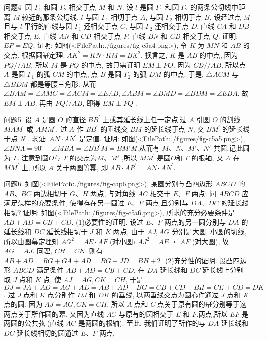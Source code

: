 问题4. 圆 $\Gamma_1$ 和圆 $\Gamma_2$ 相交于点 $M$ 和 $N$. 设 $l$ 是圆 $\Gamma_1$ 和圆 $\Gamma_2$ 的两条公切线中距离 $M$ 较近的那条公切线.
$l$ 与圆 $\Gamma_1$ 相切于点 $A$, 与圆 $\Gamma_2$ 相切于点 $B$. 设经过点 $M$ 且与 $l$ 平行的直线与圆 $\Gamma_1$ 还相交于点 $C$, 与圆 $\Gamma_2$ 还相交于点 $D$. 直线 $C A$ 和 $D B$ 相交于点 $E$, 直线 $A N$ 和 $C D$ 相交于点 $P$, 直线 $B N$ 和 $C D$ 相交于点 $Q$. 证明: $E P=E Q$.
证明: 如图(<FilePath:./figures/fig-c5a4.png>), 令 $K$ 为 $M N$ 和 $A B$ 的交点.
根据圆幂定理: $A K^2=K N \cdot K M=B K^2$. 换言之, $K$ 是 $A B$ 的中点, 因为 $P Q / / A B$, 所以 $M$ 是 $P Q$ 的中点, 故只需证明 $E M \perp P Q$.
因为 $C D // A B$, 所以点 $A$ 是圆 $\Gamma_1$ 的弧 $C M$ 的中点, 点 $B$ 是圆 $\Gamma_2$ 的弧 $D M$ 的中点.
于是, $\triangle A C M$ 与 $\triangle B D M$ 都是等腰三角形.
从而 $\angle B A M= \angle A M C=\angle A C M=\angle E A B, \angle A B M= \angle B M D=\angle B D M=\angle E B A$. 故 $E M \perp A B$. 再由 $PQ // AB$, 即得 $E M\perp P Q$ .



问题5. 设 $A$ 是圆 $O$ 的直径 $B B^{\prime}$ 上或其延长线上任一定点,过 $A$ 引圆 $O$ 的割线 $M A M^{\prime}$ 或 $A M M^{\prime}$, 过 $A$ 作 $B B^{\prime}$ 的垂线交 $B M$ 的延长线于点 $N$, 交 $B M^{\prime}$ 的延长线于点 $N^{\prime}$. 求证: $A N \cdot A N^{\prime}$ 是定值.
证明: 如图(<FilePath:./figures/fig-c5a5.png>), $\angle B N A=90^{\circ}-\angle M B A=\angle B B^{\prime}M= BM'M$.从而有 $M、N、M'、N'$ 共圆,记此圆为 $\Gamma$. 注意到圆$O$与 $\Gamma$ 的交点为$M、M'$ ,所以 $M M^{\prime}$ 是圆$O$和 $\Gamma$ 的根轴, 又 $A$ 在 $M M^{\prime}$ 上, 所以 $A$ 关于两圆等幂, 即 $A B \cdot A B^{\prime}=A N \cdot A N^{\prime}$.



问题6. 如图(<FilePath:./figures/fig-c5p6.png>), 某圆分别与凸四边形 $A B C D$ 的 $A B 、 B C$ 两边相切于 $G 、 H$ 两点, 与对角线 $A C$ 相交于 $E 、 F$ 两点: 问 $A B C D$ 应满足怎样的充要条件, 使得存在另一圆过 $E 、 F$ 两点,且分别与 $D A 、 D C$ 的延长线相切?
证明: 如图(<FilePath:./figures/fig-c5a6.png>), 所求的充分必要条件是 $A B+ A D=C B+C D$.
(1)必要性的证明.
设过 $E 、 F$ 两点的另一圆分别与 $D A$ 的延长线和 $D C$ 延长线相切于 $J$ 和 $K$ 两点, 由于 $A J, A G$ 分别是大圆, 小圆的切线,所以由圆幕定理知 $A G^2=A E \cdot A F$ (对小圆) $A J^2=A E$ ・ $A F$ (对大圆), 故 $A G=A J$. 同理, $C H=C K$. 则有 $A B+A D=B G+G A+A D=B G+J D=B H+ 2^{\circ}$ 
(2)充分性的证明.
设凸四边形 $A B C D$ 满足条件 $A B+A D=C B+C D$. 在 $D A$ 延长线和 $D C$ 延长线上分别取 $J$ 点和 $K$ 点, 使 $A J=A G, C K=C H$, 于是
$D J=J A+A D=A G+A D=A B+A D-B G=C B+C D-B H=C H+ C D=D K$. 过 $J$ 点和 $K$ 点分别作 $D J$ 和 $D K$ 的垂线, 以两垂线交点为圆心作通过 $J$ 点和 $K$ 点的圆.
因为 $A J=A G, C K=C H$, 所以 $A$ 点和 $C$ 点关于原有圆的幂分别等于这两点关于所作圆的幕.
又因为直线 $A C$ 与原有的圆相交于 $E$ 和 $F$.两点,所以 $E F$ 是两圆的公共弦 (直线 $A C$ 是两圆的根轴).
至此, 我们证明了所作的与 $D A$ 延长线和 $D C$ 延长线相切的圆通过 $E 、 F$ 两点.



